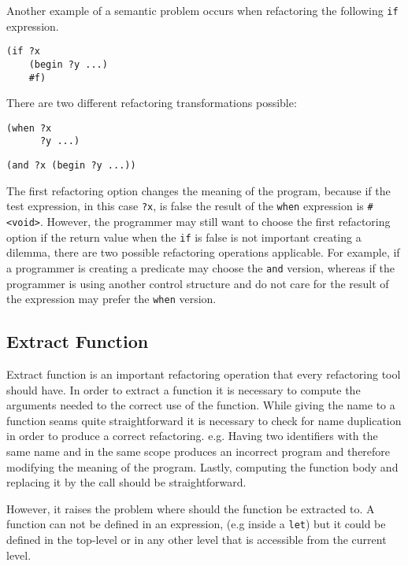Another example of a semantic problem occurs when refactoring the following {\tt if}
expression.
\begin{lstlisting}[basicstyle=\ttfamily, caption=Code sample]
(if ?x
    (begin ?y ...)
    #f)
\end{lstlisting}
There are two different refactoring transformations possible:
\begin{lstlisting}[basicstyle=\ttfamily, caption=Refactoring option 1]
(when ?x
      ?y ...)
\end{lstlisting}

\begin{lstlisting}[basicstyle=\ttfamily, caption=Refactoring option 2]
(and ?x (begin ?y ...))
\end{lstlisting}

The first refactoring option changes the meaning of the program, because if the
test expression, in this case {\tt ?x}, is false the result of the {\tt when} expression is {\tt \#<void>}.
However, the programmer may still want to choose the first refactoring option if
the return value when the {\tt if} is false is not important creating a dilemma,
there are two possible refactoring operations applicable.
For example, if a programmer is creating a predicate may
choose the {\tt and} version, whereas if the programmer is using another control structure
and do not care for the result of the expression may prefer the {\tt when} version.

\subsection{Extract Function}
Extract function is an important refactoring operation that every refactoring tool
should have.
In order to extract a function it is necessary to compute the arguments needed
to the correct use of the function.
While giving the name to a function seams quite straightforward it is necessary to
check for name duplication in order to produce a correct refactoring. e.g. Having
two identifiers with the same name and in the same scope produces an incorrect program
and therefore modifying the meaning of the program.
Lastly, computing the function body and replacing it by the call should be straightforward.

However, it raises the problem where should the function be extracted to. A function can not
be defined in an expression, (e.g inside a {\tt let}) but it could be defined in the top-level
or in any other level that is accessible from the current level.

